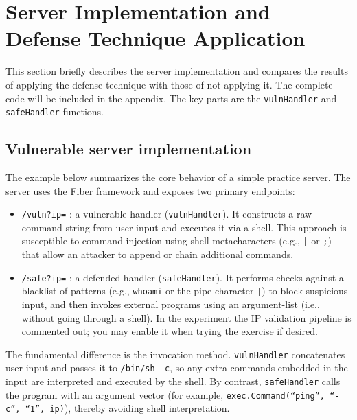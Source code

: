 \documentclass{article}
\begin{document}
\section{Server Implementation and Defense Technique Application}
This section briefly describes the server implementation and compares the results of applying the defense technique with those of not applying it.
The complete code will be included in the appendix.
The key parts are the \texttt{vulnHandler} and \texttt{safeHandler} functions.

\subsection{Vulnerable server implementation}

The example below summarizes the core behavior of a simple practice server. The server uses the Fiber framework and exposes two primary endpoints:

\begin{itemize}
\item \texttt{/vuln?ip=} : a vulnerable handler (\texttt{vulnHandler}). It constructs a raw command string from user input and executes it via a shell. This approach is susceptible to command injection using shell metacharacters (e.g., \texttt{|} or \texttt{;}) that allow an attacker to append or chain additional commands.
\item \texttt{/safe?ip=} : a defended handler (\texttt{safeHandler}). It performs checks against a blacklist of patterns (e.g., \texttt{whoami} or the pipe character \texttt{|}) to block suspicious input, and then invokes external programs using an argument-list (i.e., without going through a shell). In the experiment the IP validation pipeline is commented out; you may enable it when trying the exercise if desired.
\end{itemize}

The fundamental difference is the invocation method. \texttt{vulnHandler} concatenates user input and passes it to \texttt{/bin/sh -c}, so any extra commands embedded in the input are interpreted and executed by the shell. By contrast, \texttt{safeHandler} calls the program with an argument vector (for example, \texttt{exec.Command(“ping”, “-c”, “1”, ip)}), thereby avoiding shell interpretation.
\end{document}
